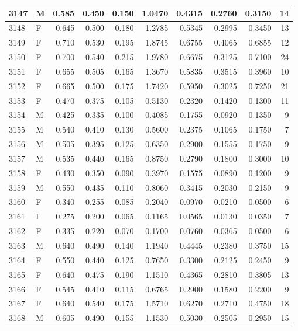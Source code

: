 \documentclass[9pt,twocolumn,twoside,]{pnas-new}
\begin{document}
\begin{tabular}{l|l|r|r|r|r|r|r|r|r}
\hline
3147 & M & 0.585 & 0.450 & 0.150 & 1.0470 & 0.4315 & 0.2760 & 0.3150 & 14\\
\hline
3148 & F & 0.645 & 0.500 & 0.180 & 1.2785 & 0.5345 & 0.2995 & 0.3450 & 13\\
\hline
3149 & F & 0.710 & 0.530 & 0.195 & 1.8745 & 0.6755 & 0.4065 & 0.6855 & 12\\
\hline
3150 & F & 0.700 & 0.540 & 0.215 & 1.9780 & 0.6675 & 0.3125 & 0.7100 & 24\\
\hline
3151 & F & 0.655 & 0.505 & 0.165 & 1.3670 & 0.5835 & 0.3515 & 0.3960 & 10\\
\hline
3152 & F & 0.665 & 0.500 & 0.175 & 1.7420 & 0.5950 & 0.3025 & 0.7250 & 21\\
\hline
3153 & F & 0.470 & 0.375 & 0.105 & 0.5130 & 0.2320 & 0.1420 & 0.1300 & 11\\
\hline
3154 & M & 0.425 & 0.335 & 0.100 & 0.4085 & 0.1755 & 0.0920 & 0.1350 & 9\\
\hline
3155 & M & 0.540 & 0.410 & 0.130 & 0.5600 & 0.2375 & 0.1065 & 0.1750 & 7\\
\hline
3156 & M & 0.505 & 0.395 & 0.125 & 0.6350 & 0.2900 & 0.1555 & 0.1750 & 9\\
\hline
3157 & M & 0.535 & 0.440 & 0.165 & 0.8750 & 0.2790 & 0.1800 & 0.3000 & 10\\
\hline
3158 & F & 0.430 & 0.350 & 0.090 & 0.3970 & 0.1575 & 0.0890 & 0.1200 & 9\\
\hline
3159 & M & 0.550 & 0.435 & 0.110 & 0.8060 & 0.3415 & 0.2030 & 0.2150 & 9\\
\hline
3160 & F & 0.340 & 0.255 & 0.085 & 0.2040 & 0.0970 & 0.0210 & 0.0500 & 6\\
\hline
3161 & I & 0.275 & 0.200 & 0.065 & 0.1165 & 0.0565 & 0.0130 & 0.0350 & 7\\
\hline
3162 & F & 0.335 & 0.220 & 0.070 & 0.1700 & 0.0760 & 0.0365 & 0.0500 & 6\\
\hline
3163 & M & 0.640 & 0.490 & 0.140 & 1.1940 & 0.4445 & 0.2380 & 0.3750 & 15\\
\hline
3164 & F & 0.550 & 0.440 & 0.125 & 0.7650 & 0.3300 & 0.2125 & 0.2450 & 9\\
\hline
3165 & F & 0.640 & 0.475 & 0.190 & 1.1510 & 0.4365 & 0.2810 & 0.3805 & 13\\
\hline
3166 & F & 0.545 & 0.410 & 0.115 & 0.6765 & 0.2900 & 0.1580 & 0.2200 & 9\\
\hline
3167 & F & 0.640 & 0.540 & 0.175 & 1.5710 & 0.6270 & 0.2710 & 0.4750 & 18\\
\hline
3168 & M & 0.605 & 0.490 & 0.155 & 1.1530 & 0.5030 & 0.2505 & 0.2950 & 15\\

\end{tabular}
\end{document}

